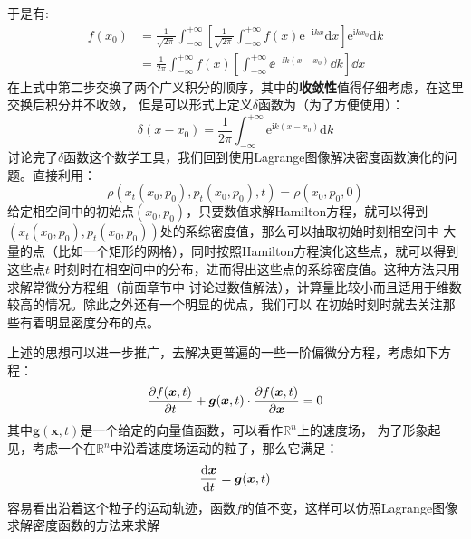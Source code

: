     于是有:
    \begin{equation}
        \begin{split}
            f(x_0) &= \frac 1{\sqrt{2\pi}} \int_{-\infty}^{+\infty}\left[\frac 1{\sqrt{2\pi}} 
            \int_{-\infty}^{+\infty} f(x)\mathrm{e}^{-\mathrm{i}kx}\mathrm{d}x\right] \mathrm{e}^{\mathrm{i}kx_0}\mathrm{d}k\\
            &= \frac 1{2\pi} \int_{-\infty}^{+\infty}f(x)\left[\int_{-\infty}^{+\infty}\ee^{-\ii k(x - x_0)}\dd k\right]\dd x
        \end{split}
    \end{equation}
    在上式中第二步交换了两个广义积分的顺序，其中的\textbf{收敛性}值得仔细考虑，在这里交换后积分并不收敛，
    但是可以形式上定义$\delta$函数为（为了方便使用）：
    \begin{equation}
        \delta(x-x_0) = \frac 1{2\pi} \int_{-\infty}^{+\infty} \mathrm{e}^{\mathrm{i}k(x-x_0)}\mathrm{d}k
        \label{integral formation of delta function}
    \end{equation}
    讨论完了$\delta$函数这个数学工具，我们回到使用Lagrange图像解决密度函数演化的问题。直接利用：
    \begin{equation}
        \rho(x_t(x_0, p_0), p_t(x_0, p_0), t) = \rho(x_0, p_0, 0)
    \end{equation}
    给定相空间中的初始点$(x_0, p_0)$，只要数值求解Hamilton方程，就可以得到
    $(x_t(x_0, p_0), p_t(x_0, p_0))$处的系综密度值，那么可以抽取初始时刻相空间中
    大量的点（比如一个矩形的网格），同时按照Hamilton方程演化这些点，就可以得到这些点$t$
    时刻时在相空间中的分布，进而得出这些点的系综密度值。这种方法只用求解常微分方程组（前面章节中
    讨论过数值解法），计算量比较小而且适用于维数较高的情况。除此之外还有一个明显的优点，我们可以
    在初始时刻时就去关注那些有着明显密度分布的点。
    \par 
    上述的思想可以进一步推广，去解决更普遍的一些一阶偏微分方程，考虑如下方程：
    \begin{equation}
        \frac{\partial{f(\bm{x}, t)}}{\partial{t}} + \bm{g}(\bm{x}, t) \cdot \frac{\partial{f(\bm{x}, t)}}{\partial{\bm{x}}} = 0
    \end{equation}
    其中$\bm{g}(\bm{x}, t)$是一个给定的向量值函数，可以看作$\mathbb{R}^n$上的速度场，
    为了形象起见，考虑一个在$\mathbb{R}^n$中沿着速度场运动的粒子，那么它满足：
    \begin{equation}
        \frac{\mathrm{d}{\bm{x}}}{\mathrm{d}{t}} = \bm{g}(\bm{x}, t)
        \label{character line}
    \end{equation}
    容易看出沿着这个粒子的运动轨迹，函数$f$的值不变，这样可以仿照Lagrange图像求解密度函数的方法来求解

